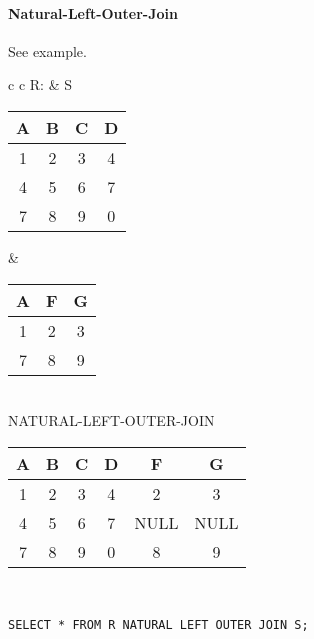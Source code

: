 \paragraph{Natural-Left-Outer-Join} See example.\\
\begin{tabular}{ c c}
	R: & S\\
	\begin{tabular}{|c|c|c|c|}
		\hline
		A & B & C & D\\
		\hline
		1 & 2 & 3 & 4\\
		\hline
		4 & 5 & 6 & 7\\
		\hline
		7 & 8 & 9 & 0\\
		\hline
	\end{tabular} &

	\begin{tabular}{|c|c|c|}
		\hline
		A & F & G \\
		\hline
		1 & 2 & 3\\
		\hline
		7 & 8 & 9\\
		\hline
	\end{tabular}
\end{tabular}\\

NATURAL-LEFT-OUTER-JOIN\\
\begin{tabular}{|c|c|c|c|c|c|}
	\hline
	A & B & C & D & F & G\\
	\hline
	1 & 2 & 3 & 4 & 2 & 3\\
	\hline
	4 & 5 & 6 & 7 & NULL & NULL\\
	\hline
	7 & 8 & 9 & 0 & 8 & 9\\
	\hline
\end{tabular}\\

\lstset{language=SQL,tabsize=4,captionpos=b,frame=single,
basicstyle=\footnotesize}
\begin{lstlisting}[caption=Natural-Left-Outer-Join]
SELECT * FROM R NATURAL LEFT OUTER JOIN S;
\end{lstlisting}

